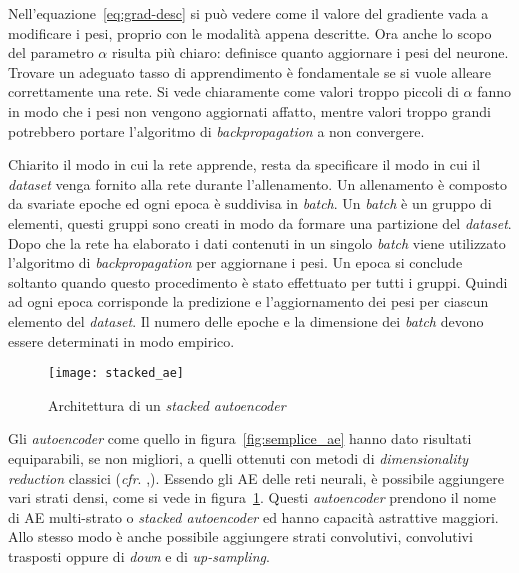 Nell'equazione~\ref{eq:grad-desc} si può vedere come il valore del gradiente vada a modificare i pesi, proprio con le modalità appena descritte.
Ora anche lo scopo del parametro $\alpha$ risulta più chiaro: definisce quanto aggiornare i pesi del neurone.
Trovare un adeguato tasso di apprendimento è fondamentale se si vuole alleare correttamente una rete.
Si vede chiaramente come valori troppo piccoli di $\alpha$ fanno in modo che i pesi non vengono aggiornati affatto, mentre valori troppo grandi potrebbero portare l'algoritmo di \textit{backpropagation} a non convergere. %

Chiarito il modo in cui la rete apprende, resta da specificare il modo in cui il \textit{dataset} venga fornito alla rete durante l'allenamento.
Un allenamento è composto da svariate epoche ed ogni epoca è suddivisa in \textit{batch}.
Un \textit{batch} è un gruppo di elementi, questi gruppi sono creati in modo da formare una partizione del \textit{dataset}.
Dopo che la rete ha elaborato i dati contenuti in un singolo \textit{batch} viene utilizzato l'algoritmo di \textit{backpropagation} per aggiornane i pesi.
Un epoca si conclude soltanto quando questo procedimento è stato effettuato per tutti i gruppi.
Quindi ad ogni epoca corrisponde la predizione e l'aggiornamento dei pesi per ciascun elemento del \textit{dataset}.
Il numero delle epoche e la dimensione dei \textit{batch} devono essere determinati in modo empirico. %


\begin{figure}[ht] %
  \begin{center}
    \centering\texttt{[image: stacked\_ae]}
  \end{center}
  \caption{Architettura di un \textit{stacked autoencoder}}
  \label{fig:stacked_ae}
\end{figure}
Gli \textit{autoencoder} come quello in figura~\ref{fig:semplice_ae} hanno dato risultati equiparabili, se non migliori, a quelli ottenuti con metodi di \textit{dimensionality reduction} classici (\textit{cfr}. \cite{ng_sparse_ae},\cite{pca_vs_ae_1}).
Essendo gli AE delle reti neurali, è possibile aggiungere vari strati densi, come si vede in figura~\ref{fig:stacked_ae}.
Questi \textit{autoencoder} prendono il nome di AE multi-strato o \textit{stacked autoencoder} ed hanno capacità astrattive maggiori. %
Allo stesso modo è anche possibile aggiungere strati convolutivi, convolutivi trasposti oppure di \textit{down} e di \textit{up-sampling}.

